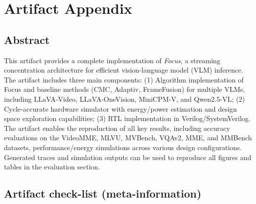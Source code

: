 %
%
%
%
%



\appendix
\section{Artifact Appendix}

\subsection{Abstract}

This artifact provides a complete implementation of \textit{Focus}, a streaming concentration architecture
for efficient vision-language model (VLM) inference. The artifact includes three main components:
(1) Algorithm implementation of Focus and baseline methods (CMC, Adaptiv, FrameFusion) for multiple VLMs, including LLaVA-Video, LLaVA-OneVision, MiniCPM-V, and Qwen2.5-VL; (2) Cycle-accurate hardware simulator with energy/power estimation and design space exploration capabilities; (3) RTL implementation in Verilog/SystemVerilog. The artifact enables the reproduction of all key results, including accuracy evaluations on the VideoMME, MLVU, MVBench, VQAv2, MME, and MMBench datasets, performance/energy simulations across various design configurations. Generated traces and simulation outputs can be used to reproduce all figures and tables in the evaluation section.

\subsection{Artifact check-list (meta-information)}

